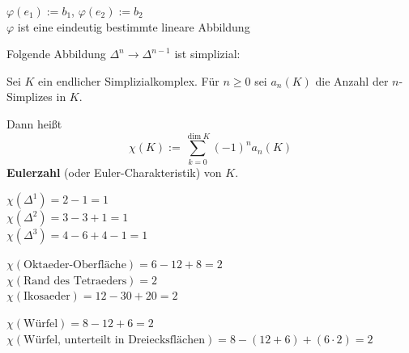 \begin{beispiel}
    \begin{bspenum}
        \item $\varphi(e_1) := b_1$, $\varphi(e_2) := b_2$\\
              $\varphi$ ist eine eindeutig bestimmte lineare Abbildung

              

        \item Folgende Abbildung $\Delta^n \rightarrow \Delta^{n-1}$ 
              ist simplizial:

              
        \item {}

            \resizebox{0.9\linewidth}{!}{}
    \end{bspenum}
\end{beispiel}

\begin{definition}%
    Sei $K$ ein endlicher Simplizialkomplex. Für $n \geq 0$ sei
    $a_n(K)$ die Anzahl der $n$-Simplizes in $K$.

    Dann heißt 
    \[\chi(K) := \sum_{k=0}^{\dim K} (-1)^n a_n(K)\]
    \textbf{Eulerzahl} (oder Euler-Charakteristik)
    von $K$.
\end{definition}

\begin{beispiel}
    \begin{bspenum}
        \item $\chi(\Delta^1) = 2 - 1 = 1$\\
              $\chi(\Delta^2) = 3 - 3 + 1 = 1$\\
              $\chi(\Delta^3) = 4 - 6 + 4 - 1 = 1$
        \item $\chi(\text{Oktaeder-Oberfläche}) = 6 - 12 + 8 = 2$\\
              $\chi(\text{Rand des Tetraeders}) = 2$\\
              $\chi(\text{Ikosaeder}) = 12 - 30 + 20 = 2$
        \item $\chi(\text{Würfel}) = 8 - 12 + 6 = 2$\\
              $\chi(\text{Würfel, unterteilt in Dreiecksflächen}) = 8 - (12 + 6) + (6 \cdot 2) = 2$
    \end{bspenum}
\end{beispiel}

